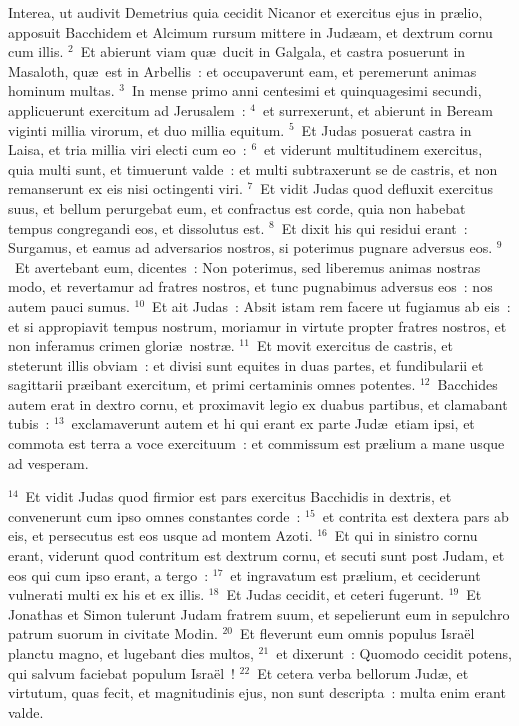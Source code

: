 \lettrine[lines=3,image=true,loversize=0.05,lraise=-0.03]{I}{}nterea, ut audivit Demetrius quia cecidit Nicanor et exercitus ejus in pr\ae lio, apposuit Bacchidem et Alcimum rursum mittere in Jud\ae am, et dextrum cornu cum illis.
${}^{2}$~Et abierunt viam qu\ae\ ducit in Galgala, et castra posuerunt in Masaloth, qu\ae\ est in Arbellis~: et occupaverunt eam, et peremerunt animas hominum multas.
${}^{3}$~In mense primo anni centesimi et quinquagesimi secundi, applicuerunt exercitum ad Jerusalem~:
${}^{4}$~et surrexerunt, et abierunt in Beream viginti millia virorum, et duo millia equitum.
${}^{5}$~Et Judas posuerat castra in Laisa, et tria millia viri electi cum eo~:
${}^{6}$~et viderunt multitudinem exercitus, quia multi sunt, et timuerunt valde~: et multi subtraxerunt se de castris, et non remanserunt ex eis nisi octingenti viri.
${}^{7}$~Et vidit Judas quod defluxit exercitus suus, et bellum perurgebat eum, et confractus est corde, quia non habebat tempus congregandi eos, et dissolutus est.
${}^{8}$~Et dixit his qui residui erant~: Surgamus, et eamus ad adversarios nostros, si poterimus pugnare adversus eos.
${}^{9}$~Et avertebant eum, dicentes~: Non poterimus, sed liberemus animas nostras modo, et revertamur ad fratres nostros, et tunc pugnabimus adversus eos~: nos autem pauci sumus.
${}^{10}$~Et ait Judas~: Absit istam rem facere ut fugiamus ab eis~: et si appropiavit tempus nostrum, moriamur in virtute propter fratres nostros, et non inferamus crimen glori\ae\ nostr\ae .
${}^{11}$~Et movit exercitus de castris, et steterunt illis obviam~: et divisi sunt equites in duas partes, et fundibularii et sagittarii pr\ae ibant exercitum, et primi certaminis omnes potentes.
${}^{12}$~Bacchides autem erat in dextro cornu, et proximavit legio ex duabus partibus, et clamabant tubis~:
${}^{13}$~exclamaverunt autem et hi qui erant ex parte Jud\ae\ etiam ipsi, et commota est terra a voce exercituum~: et commissum est pr\ae lium a mane usque ad vesperam.


${}^{14}$~Et vidit Judas quod firmior est pars exercitus Bacchidis in dextris, et convenerunt cum ipso omnes constantes corde~:
${}^{15}$~et contrita est dextera pars ab eis, et persecutus est eos usque ad montem Azoti.
${}^{16}$~Et qui in sinistro cornu erant, viderunt quod contritum est dextrum cornu, et secuti sunt post Judam, et eos qui cum ipso erant, a tergo~:
${}^{17}$~et ingravatum est pr\ae lium, et ceciderunt vulnerati multi ex his et ex illis.
${}^{18}$~Et Judas cecidit, et ceteri fugerunt.
${}^{19}$~Et Jonathas et Simon tulerunt Judam fratrem suum, et sepelierunt eum in sepulchro patrum suorum in civitate Modin.
${}^{20}$~Et fleverunt eum omnis populus Isra\"el planctu magno, et lugebant dies multos,
${}^{21}$~et dixerunt~: Quomodo cecidit potens, qui salvum faciebat populum Isra\"el~!
${}^{22}$~Et cetera verba bellorum Jud\ae , et virtutum, quas fecit, et magnitudinis ejus, non sunt descripta~: multa enim erant valde.



